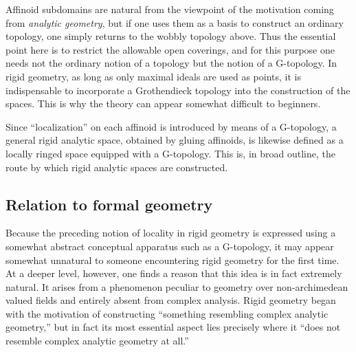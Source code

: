 \documentclass[a4paper,12pt, dvipdfmx]{jsbook}
\theoremstyle{plain}
\theoremstyle{definition}
\begin{document}
Affinoid subdomains are natural from the viewpoint of the motivation coming from {\it analytic geometry}, but if one uses them as a basis to construct an ordinary topology, one simply returns to the wobbly topology above.
Thus the essential point here is to restrict the allowable open coverings, and for this purpose one needs not the ordinary notion of a topology but the notion of a G-topology.
In rigid geometry, as long as only maximal ideals are used as points, it is indispensable to incorporate a Grothendieck topology into the construction of the spaces. This is why the theory can appear somewhat difficult to beginners.

Since ``localization'' on each affinoid is introduced by means of a G-topology, a general rigid analytic space, obtained by gluing affinoids, is likewise defined as a locally ringed space equipped with a G-topology.
This is, in broad outline, the route by which rigid analytic spaces are constructed.

\subsection{Relation to formal geometry}\label{sub-formalrigidgeometry}
Because the preceding notion of locality in rigid geometry is expressed using a somewhat abstract conceptual apparatus such as a G-topology, it may appear somewhat unnatural to someone encountering rigid geometry for the first time.
At a deeper level, however, one finds a reason that this idea is in fact extremely natural.
It arises from a phenomenon peculiar to geometry over non-archimedean valued fields and entirely absent from complex analysis.
Rigid geometry began with the motivation of constructing ``something resembling complex analytic geometry,'' but in fact its most essential aspect lies precisely where it ``does not resemble complex analytic geometry at all.''
\end{document}
